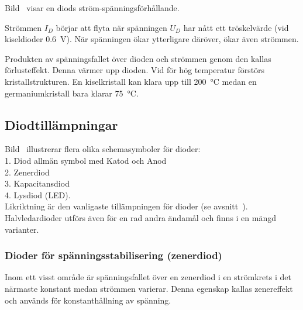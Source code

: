 Bild~ visar en diods ström-spänningsförhållande.

Strömmen \(I_D\) börjar att flyta när spänningen \(U_D\) har nått ett
tröskelvärde (vid kiseldioder \qty{0,6}{\volt}).
När spänningen ökar ytterligare däröver, ökar även strömmen.

Produkten av spänningsfallet över dioden och strömmen genom den kallas
förlusteffekt. Denna värmer upp dioden. Vid för hög temperatur förstörs
kristallstrukturen.
En kiselkristall kan klara upp till \qty{200}{\degreeCelsius} medan en
germaniumkristall bara klarar \qty{75}{\degreeCelsius}.\\


\subsection{Diodtillämpningar}

Bild~ illustrerar flera olika schemasymboler för dioder:\\
1. Diod allmän symbol med Katod och Anod\\
2. Zenerdiod\\
3. Kapacitansdiod\\
4. Lysdiod (LED).\\

Likriktning är den vanligaste tillämpningen för dioder (se
avsnitt~).
Halvledardioder utförs även för en rad andra ändamål och finns i en mängd
varianter.

\subsubsection{Dioder för spänningsstabilisering (zenerdiod)}
\label{subsec:zenerdiod}

Inom ett visst område är spänningsfallet över en zenerdiod i en strömkrets i det
närmaste konstant medan strömmen varierar.
Denna egenskap kallas zenereffekt och används för konstanthållning av spänning.

